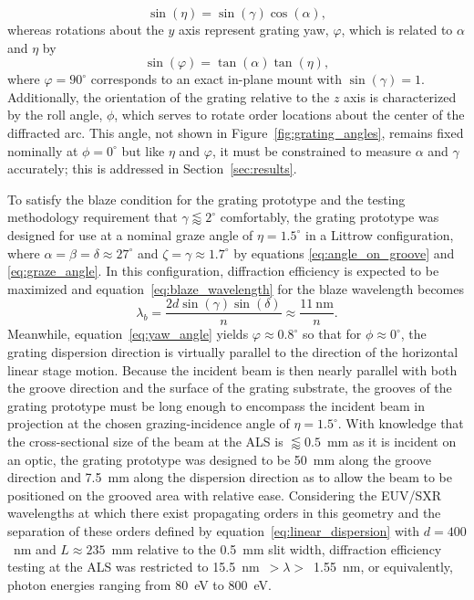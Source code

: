\documentclass{aastex63}
\begin{document}
\begin{equation}\label{eq:graze_angle}
 \sin \left( \eta \right) = \sin \left( \gamma \right) \cos \left( \alpha \right) ,
 \end{equation}
whereas rotations about the $y$ axis represent grating yaw, $\varphi$, which is related to $\alpha$ and $\eta$ by 
\begin{equation}\label{eq:yaw_angle}
 \sin \left( \varphi \right) = \tan \left( \alpha \right) \tan \left( \eta \right) ,
 \end{equation}
where $\varphi = 90^{\circ}$ corresponds to an exact in-plane mount with $\sin \left( \gamma \right) = 1$. 
Additionally, the orientation of the grating relative to the $z$ axis is characterized by the roll angle, $\phi$, which serves to rotate order locations about the center of the diffracted arc. 
This angle, not shown in Figure~\ref{fig:grating_angles}, remains fixed nominally at $\phi = 0^{\circ}$ but like $\eta$ and $\varphi$, it must be constrained to measure $\alpha$ and $\gamma$ accurately; this is addressed in Section~\ref{sec:results}. 

To satisfy the blaze condition for the grating prototype and the testing methodology requirement that $\gamma \lessapprox 2^{\circ}$ comfortably, the grating prototype was designed for use at a nominal graze angle of $\eta = 1.5^{\circ}$ in a Littrow configuration, where $\alpha = \beta = \delta \approx 27^{\circ}$ and $\zeta = \gamma \approx 1.7^{\circ}$ by equations \ref{eq:angle_on_groove} and \ref{eq:graze_angle}. 
In this configuration, diffraction efficiency is expected to be maximized and equation~\ref{eq:blaze_wavelength} for the blaze wavelength becomes 
\begin{equation}\label{eq:blaze_wavelength_littrow}
 \lambda_b = \frac{2 d \sin \left( \gamma \right) \sin \left( \delta \right) }{n} \approx \frac{11~\text{nm}}{n}.
 \end{equation}
Meanwhile, equation~\ref{eq:yaw_angle} yields $\varphi \approx 0.8^{\circ}$ so that for $\phi \approx 0^{\circ}$, the grating dispersion direction is virtually parallel to the direction of the horizontal linear stage motion. 
Because the incident beam is then nearly parallel with both the groove direction and the surface of the grating substrate, the grooves of the grating prototype must be long enough to encompass the incident beam in projection at the chosen grazing-incidence angle of $\eta = 1.5^{\circ}$. 
With knowledge that the cross-sectional size of the beam at the ALS is $\lessapprox 0.5$~mm as it is incident on an optic, the grating prototype was designed to be 50~mm along the groove direction and 7.5~mm along the dispersion direction as to allow the beam to be positioned on the grooved area with relative ease. 
Considering the EUV/SXR wavelengths at which there exist propagating orders in this geometry and the separation of these orders defined by equation~\ref{eq:linear_dispersion} with $d=400$~nm and $L \approx 235$~mm relative to the 0.5~mm slit width, diffraction efficiency testing at the ALS was restricted to 15.5~nm~$> \lambda >$~1.55~nm, or equivalently, photon energies ranging from 80~eV to 800~eV. 
\end{document}
